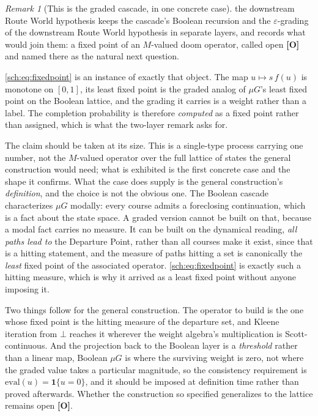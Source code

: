 \documentclass[11pt]{article}
\newcommand{\one}{\mathbf{1}}
\theoremstyle{plain}
\theoremstyle{definition}
\theoremstyle{remark}
\newtheorem{remark}[theorem]{Remark}
\begin{document}
\begin{remark}[This is the graded cascade, in one concrete case]
\label{sch:rem:mvalued}
the downstream Route World hypothesis keeps the cascade's Boolean recursion and the
$\varepsilon$-grading of the downstream Route World hypothesis in separate
layers, and records what would join them: a fixed point of an
$M$-valued doom operator, called open \textbf{[O]} and named there as
the natural next question.

\eqref{sch:eq:fixedpoint} is an instance of exactly that object. The map
$u\mapsto s\,f(u)$ is monotone on $[0,1]$, its least fixed point is the
graded analog of $\mu G$'s least fixed point on the Boolean lattice,
and the grading it carries is a weight rather than a label. The
completion probability is therefore \emph{computed} as a fixed point
rather than assigned, which is what the two-layer remark asks for.

The claim should be taken at its size. This is a single-type process
carrying one number, not the $M$-valued operator over the full lattice
of states the general construction would need; what is exhibited is the
first concrete case and the shape it confirms. What the case does supply is the general construction's
\emph{definition}, and the choice is not the obvious one. The Boolean
cascade characterizes $\mu G$ modally: every course admits a foreclosing
continuation, which is a fact about the state space. A graded version
cannot be built on that, because a modal fact carries no measure. It can
be built on the dynamical reading, \emph{all paths lead to} the
Departure Point, rather than all courses make it exist, since that is
a hitting statement, and the measure of paths hitting a set is
canonically the \emph{least} fixed point of the associated operator.
\eqref{sch:eq:fixedpoint} is exactly such a hitting measure, which is why
it arrived as a least fixed point without anyone imposing it.

Two things follow for the general construction. The operator to build is
the one whose fixed point is the hitting measure of the departure set,
and Kleene iteration from $\bot$ reaches it wherever the weight algebra's
multiplication is Scott-continuous. And the projection back to the
Boolean layer is a \emph{threshold} rather than a linear map, Boolean
$\mu G$ is where the surviving weight is zero, not where the graded value
takes a particular magnitude, so the consistency requirement is
$\mathrm{eval}(u)=\one\{u=0\}$, and it should be imposed at definition
time rather than proved afterwards. Whether the construction so specified
generalizes to the lattice remains open \textbf{[O]}.
\end{remark}
\end{document}
